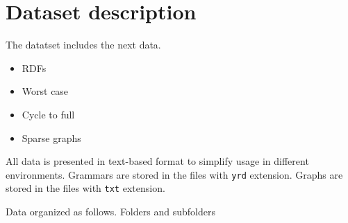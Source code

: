 \section{Dataset description}

The datatset includes the next data.
\begin{itemize}
\item RDFs~\cite{!!!}
\item Worst case~\cite{!!!Hellings}
\item Cycle to full
\item Sparse graphs~\cite{!!!}
\end{itemize}


All data is presented in text-based format to simplify usage in different environments.
Grammars are stored in the files with \verb|yrd| extension.
Graphs are stored in the files with \verb|txt| extension. 

Data organized as follows.
Folders and subfolders

